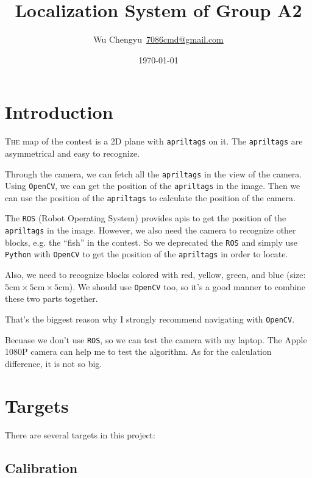 \documentclass{article}
\title{Localization System of Group A2}
\author{Wu Chengyu\ \url{7086cmd@gmail.com}}
\date{\today}
\begin{document}
\maketitle

\newpage

\tableofcontents

\newpage

\section{Introduction}

\lettrine{T}{he} map of the contest is a 2D plane with \texttt{apriltags} on it. The \texttt{apriltags} are asymmetrical and easy to recognize.

Through the camera, we can fetch all the \texttt{apriltags} in the view of the camera. Using \texttt{OpenCV}, we can get the position of the \texttt{apriltags} in the image. Then we can use the position of the \texttt{apriltags} to calculate the position of the camera.

The \texttt{ROS} (Robot Operating System) provides apis to get the position of the \texttt{apriltags} in the image. However, we also need the camera to recognize other blocks, e.g. the ``fish'' in the contest. So we deprecated the \texttt{ROS} and simply use \texttt{Python} with \texttt{OpenCV} to get the position of the \texttt{apriltags} in order to locate.

Also, we need to recognize blocks colored with red, yellow, green, and blue (size: $5\mathrm{cm}\times5\mathrm{cm}\times5\mathrm{cm}$). We should use \texttt{OpenCV} too, so it's a good manner to combine these two parts together.

That's the biggest reason why I strongly recommend navigating with \texttt{OpenCV}.

Becuase we don't use \texttt{ROS}, so we can test the camera with my laptop. The Apple 1080P camera can help me to test the algorithm. As for the calculation difference, it is not so big.

\section{Targets}

There are several targets in this project:

\subsection{Calibration}
\end{document}
